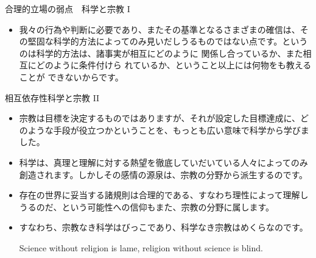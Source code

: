 \documentclass[10pt, dvipdfmx]{beamer}
\begin{document}
\begin{frame}{}

\begin{block}{合理的立場の弱点　\hfill 科学と宗教 I}
\begin{itemize}
\item 我々の行為や判断に必要であり、またその基準となるさまざまの確信は、その堅固な科学的方法によってのみ見いだしうるものではない点です。というのは科学的方法は、諸事実が相互にどのように 関係し合っているか、また相互にどのように条件付けら れているか、ということ以上には何物をも教えることが できないからです。
\end{itemize}
\end{block}

\begin{block}{相互依存性\hfill 科学と宗教 II}
\begin{itemize}
\item 宗教は目標を決定するものではありますが、それが設定した目標達成に、どのような手段が役立つかということを、もっとも広い意味で科学から学びました。
\item 科学は、真理と理解に対する熱望を徹底していだいている人々によってのみ創造されます。しかしその感情の源泉は、宗教の分野から派生するのです。
\item 存在の世界に妥当する諸規則は合理的である、すなわち理性によって理解しうるのだ、という可能性への信仰もまた、宗教の分野に属します。
\item すなわち、宗教なき科学はびっこであり、科学なき宗教はめくらなのです。\par
Science without religion is lame, religion without science is blind.
\end{itemize}
\end{block}
\end{frame}
\end{document}

